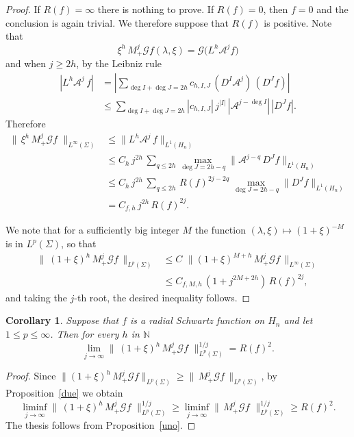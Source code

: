 \documentclass[12pt,a4paper]{amsart}
\theoremstyle{plain}
\newtheorem{corollary}[theorem]{Corollary}
\theoremstyle{definition}
\numberwithin{equation}{section}
\begin{document}
\begin{proof}  
If $R(f)=\infty$ there is nothing to prove. If $R(f)=0$, then $f=0$
and the conclusion is again trivial.
We therefore suppose that $R(f)$ is positive. Note that
$$
\xi^h\,M_+^j{\mathcal G} f({\lambda},\xi)
=
{\mathcal G}\bigl({L^h\mathcal{A}^{j} f}\bigr) 
$$
and when $j\geq 2h$,  by the Leibniz rule
\begin{align*}
|L^h \mathcal{A}^{j}\, f|
&=\left| 
\sum_{{\deg I+\deg J=2h}}
c_{h,I,J}\,({{D}}^I \mathcal{A}^{j})\,({{D}}^{J} f)
\right|
\\ 
&\leq 
\sum_{{\deg I+\deg J=2h}}|c_{h,I,J}|
\, j^{|I|} \,|\mathcal{A}^{j-\deg I}|\,|{{D}}^{J} f|.
\end{align*}
 Therefore 
\begin{align*}
\|\, \xi^h\,M_+^j{\mathcal G} f\,\,\|_{L^\infty({\Sigma})}
&\leq \|L^h\mathcal{A}^{j}\, f\|_{L^1({{H_{n}}})}
\\
&
\leq C_h\, j^{2h}\,\sum_{q\leq 2h}
\max_{\deg J=2h-q} \|\mathcal{A}^{j-q}\,{{D}}^{J} f\|_{L^1({{H_{n}}})}
\\
&
\leq C_h\, j^{2h}\,\sum_{q\leq 2h}\, R(f)^{2j-2q}\, 
\max_{\deg J=2h-q}\|{{D}}^{J} f\|_{L^1({{H_{n}}})}
\\
&
= C_{f,h}\,j^{2h}\, R(f)^{2j}.
\end{align*}
 
We note that
for a sufficiently big integer $M$ the function $({\lambda},\xi)\mapsto
(1+\xi)^{-M}$ is in $L^{p}({\Sigma})$, so that
\begin{align*}
\|\,(1+\xi)^h\,M_+^j{\mathcal G} f\,\|_{L^{p}({\Sigma})}
&\leq C\,\,
\|(1+\xi)^{M+h}\,M_+^j{\mathcal G} f\,\|_{L^{\infty}({\Sigma})}
\\
&\leq C_{f,M,h}\, \left( 1 +j^{2M+2h}\right)\,R(f)^{2j},
\end{align*}
and  
taking the $j$-th root, the desired inequality follows.
\end{proof}

\begin{corollary}
Suppose that $f$ is a radial Schwartz function on ${{H_{n}}}$ and let $1\leq p\leq \infty$.  Then
for every $h$ in ${\mathbb N}$
$$
\lim_{j\to\infty} \|\,(1+\xi)^h\,M_+^j{\mathcal G} f\,\,\|_{L^{p}({\Sigma})}^{1/j}= R(f)^2.
$$ 
\end{corollary}

\begin{proof} Since $\|(1+\xi)^h\,M_+^j{\mathcal G} f\|_{L^{p}({\Sigma})}
\geq \|\,M_+^j{\mathcal G} f\,\|_{L^{p}({\Sigma})}$, by Proposition~\ref{due} we obtain
$$
\liminf_{j\to\infty} \|\,(1+\xi)^h\,M_+^j{\mathcal G} f\,\,\|_{L^{p}({\Sigma})}^{1/j}
\geq \liminf_{j\to\infty}\|\,M_+^j{\mathcal G} f\,\,\|_{L^{p}({\Sigma})}^{1/j}\geq R(f)^2.
$$
The thesis follows from Proposition~\ref{uno}.
\end{proof}
\end{document}
